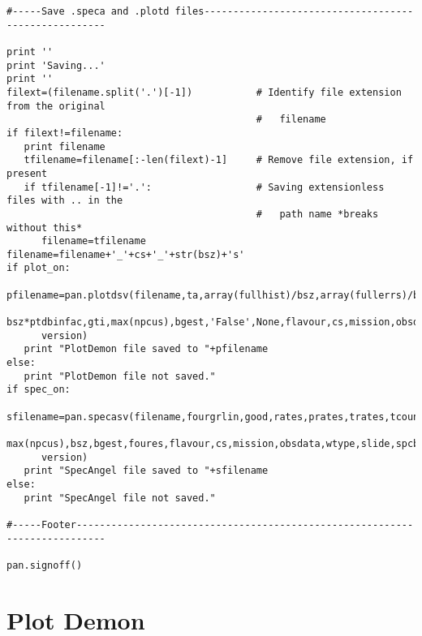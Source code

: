 \begin{verbatim}
#-----Save .speca and .plotd files-----------------------------------------------------

print ''
print 'Saving...'
print ''
filext=(filename.split('.')[-1])           # Identify file extension from the original
                                           #   filename
if filext!=filename:
   print filename
   tfilename=filename[:-len(filext)-1]     # Remove file extension, if present
   if tfilename[-1]!='.':                  # Saving extensionless files with .. in the
                                           #   path name *breaks without this*
      filename=tfilename
filename=filename+'_'+cs+'_'+str(bsz)+'s'
if plot_on:
   pfilename=pan.plotdsv(filename,ta,array(fullhist)/bsz,array(fullerrs)/bsz,tstart,
      bsz*ptdbinfac,gti,max(npcus),bgest,'False',None,flavour,cs,mission,obsdata,
      version)
   print "PlotDemon file saved to "+pfilename
else:
   print "PlotDemon file not saved."
if spec_on:
   sfilename=pan.specasv(filename,fourgrlin,good,rates,prates,trates,tcounts,
      max(npcus),bsz,bgest,foures,flavour,cs,mission,obsdata,wtype,slide,spcbinfac,
      version)
   print "SpecAngel file saved to "+sfilename
else:
   print "SpecAngel file not saved."

#-----Footer---------------------------------------------------------------------------

pan.signoff()
\end{verbatim}

\section{Plot Demon}

